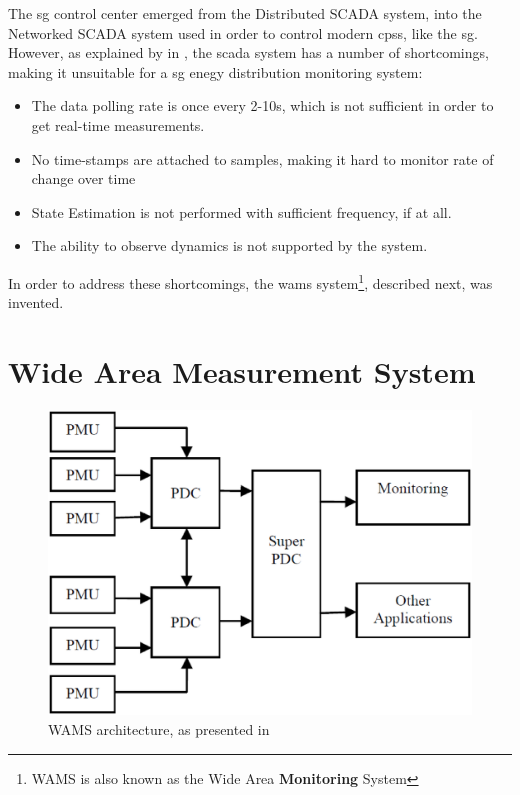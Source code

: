   
 The \acrshort{sg} control center emerged from the Distributed SCADA system, into the Networked SCADA system used in order to control modern \acrlong{cps}s, like the \acrshort{sg}.\\ 
 


 




 




However, as explained by  in \Cite{zamani2020introduction}, the \acrshort{scada} system has a number of shortcomings, making it unsuitable for a \acrshort{sg} enegy distribution monitoring system:

\begin{itemize}
    \item The data polling rate is once every 2-10s, which is not sufficient in order to get real-time measurements.
    \item No time-stamps are attached to samples, making it hard to monitor rate of change over time
    \item State Estimation is not performed with sufficient frequency, if at all.
    \item The ability to observe dynamics is not supported by the system.
\end{itemize}





In order to address these shortcomings, the \acrfull{wams} system\footnote{WAMS is also known as the Wide Area \textbf{Monitoring} System}, described next, was invented.




\section{Wide Area Measurement System}
\begin{figure}[ht]
\includegraphics[width=\linewidth]{figures/Kumar-WAMS-architecture.eps}
\caption[WAMS architecture]{WAMS architecture, as presented in \cite{kumar2015monitoring}}
\label{fig:Kumar-WAMS-architecture}
\end{figure}

